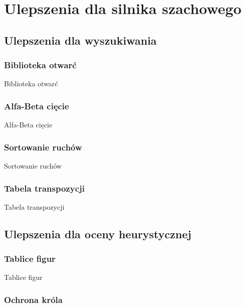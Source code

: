 
\chapter{Ulepszenia dla silnika szachowego}
\label{ch:implementacja-silnika-szachowego}



\section{Ulepszenia dla wyszukiwania}
\label{sec:ulepszenia-dla-wyszukiwania}

\subsection{Biblioteka otwarć}
\label{subsec:biblioteka-otwarc}

Biblioteka otwarć

\subsection{Alfa-Beta cięcie}
\label{subsec:alfa-beta-ciecie}

Alfa-Beta cięcie

\subsection{Sortowanie ruchów}
\label{subsec:sortowanie-ruchow}

Sortowanie ruchów

\subsection{Tabela transpozycji}
\label{subsec:tabela-transpozycji}

Tabela transpozycji


\section{Ulepszenia dla oceny heurystycznej}
\label{sec:ulepszenia-dla-oceny-heurystycznej}

\subsection{Tablice figur}
\label{subsec:tablice-figur}

Tablice figur

\subsection{Ochrona króla}
\label{subsec:ochrona-krola}

